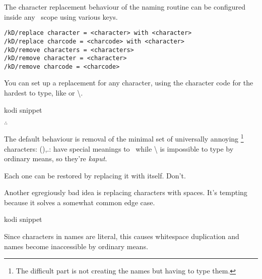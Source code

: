 The character replacement behaviour of the naming routine can be configured
inside any \koDi\ scope using various keys.

\begin{lstlisting}
/kD/replace character = <character> with <character>
/kD/replace charcode = <charcode> with <character>
/kD/remove characters = <characters>
/kD/remove character = <character>
/kD/remove charcode = <charcode>
\end{lstlisting}




You can set up a replacement for any character, using the character code for
the hardest to type, like {\ttfamily \textvisiblespace} or {\ttfamily \textbackslash}.

\begin{tcblisting}{kodi snippet}
\end{tcblisting}

\hfill$\therefore$\hfill\null

The default behaviour is removal of the minimal set of universally annoying%
\footnote{The difficult part is not creating the names but having to type them.}
characters: {\ttfamily (),.:}  have special meanings to \TikZ\ while
{\ttfamily \textbackslash} is impossible to type by ordinary means, so they're \emph{kaput}.

Each one can be restored by replacing it with itself. Don't.

Another egregiously bad idea is replacing characters with spaces.
It's tempting because it solves a somewhat common edge case.

\begin{tcblisting}{kodi snippet}
\end{tcblisting}

Since characters in names are literal, this causes whitespace
duplication and names become inaccessible by ordinary means.

